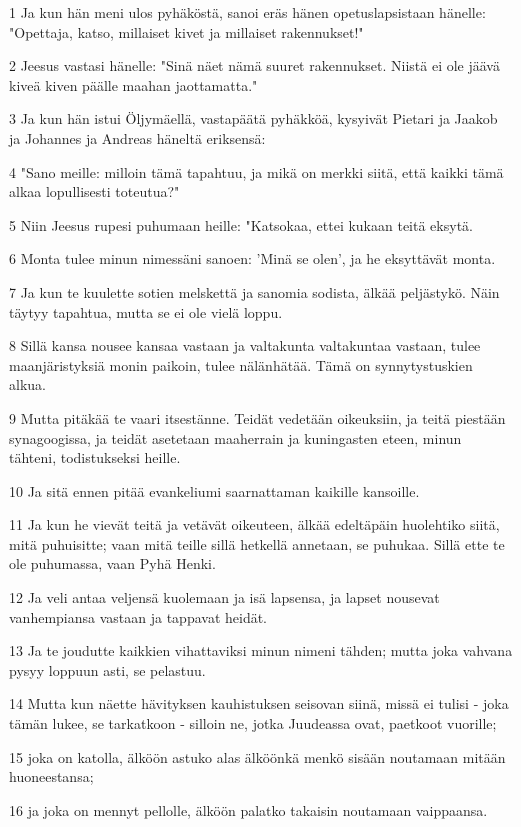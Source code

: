\par 1 Ja kun hän meni ulos pyhäköstä, sanoi eräs hänen opetuslapsistaan hänelle: "Opettaja, katso, millaiset kivet ja millaiset rakennukset!"
\par 2 Jeesus vastasi hänelle: "Sinä näet nämä suuret rakennukset. Niistä ei ole jäävä kiveä kiven päälle maahan jaottamatta."
\par 3 Ja kun hän istui Öljymäellä, vastapäätä pyhäkköä, kysyivät Pietari ja Jaakob ja Johannes ja Andreas häneltä eriksensä:
\par 4 "Sano meille: milloin tämä tapahtuu, ja mikä on merkki siitä, että kaikki tämä alkaa lopullisesti toteutua?"
\par 5 Niin Jeesus rupesi puhumaan heille: "Katsokaa, ettei kukaan teitä eksytä.
\par 6 Monta tulee minun nimessäni sanoen: 'Minä se olen', ja he eksyttävät monta.
\par 7 Ja kun te kuulette sotien melskettä ja sanomia sodista, älkää peljästykö. Näin täytyy tapahtua, mutta se ei ole vielä loppu.
\par 8 Sillä kansa nousee kansaa vastaan ja valtakunta valtakuntaa vastaan, tulee maanjäristyksiä monin paikoin, tulee nälänhätää. Tämä on synnytystuskien alkua.
\par 9 Mutta pitäkää te vaari itsestänne. Teidät vedetään oikeuksiin, ja teitä piestään synagoogissa, ja teidät asetetaan maaherrain ja kuningasten eteen, minun tähteni, todistukseksi heille.
\par 10 Ja sitä ennen pitää evankeliumi saarnattaman kaikille kansoille.
\par 11 Ja kun he vievät teitä ja vetävät oikeuteen, älkää edeltäpäin huolehtiko siitä, mitä puhuisitte; vaan mitä teille sillä hetkellä annetaan, se puhukaa. Sillä ette te ole puhumassa, vaan Pyhä Henki.
\par 12 Ja veli antaa veljensä kuolemaan ja isä lapsensa, ja lapset nousevat vanhempiansa vastaan ja tappavat heidät.
\par 13 Ja te joudutte kaikkien vihattaviksi minun nimeni tähden; mutta joka vahvana pysyy loppuun asti, se pelastuu.
\par 14 Mutta kun näette hävityksen kauhistuksen seisovan siinä, missä ei tulisi - joka tämän lukee, se tarkatkoon - silloin ne, jotka Juudeassa ovat, paetkoot vuorille;
\par 15 joka on katolla, älköön astuko alas älköönkä menkö sisään noutamaan mitään huoneestansa;
\par 16 ja joka on mennyt pellolle, älköön palatko takaisin noutamaan vaippaansa.
